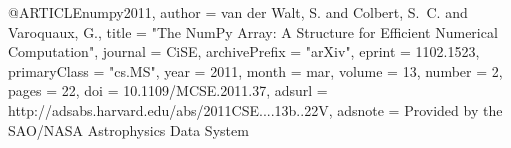 
@ARTICLE{numpy2011,
   author = {{van der Walt}, S. and {Colbert}, S.~C. and {Varoquaux}, G.},
    title = "{The NumPy Array: A Structure for Efficient Numerical Computation}",
  journal = {CiSE},
archivePrefix = "arXiv",
   eprint = {1102.1523},
 primaryClass = "cs.MS",
     year = 2011,
    month = mar,
   volume = 13,
   number = 2,
    pages = {22},
      doi = {10.1109/MCSE.2011.37},
   adsurl = {http://adsabs.harvard.edu/abs/2011CSE....13b..22V},
  adsnote = {Provided by the SAO/NASA Astrophysics Data System}
}